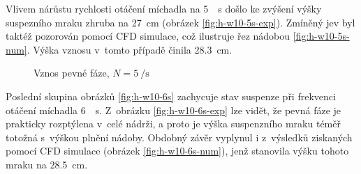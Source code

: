 Vlivem nárůstu rychlosti otáčení míchadla na \SI{5}{\per\second} došlo ke zvýšení výšky suspezního mraku zhruba na \SI{27}{\centi\meter} (obrázek \ref{fig:h-w10-5s-exp}). Zmíněný jev byl taktéž pozorován pomocí CFD simulace, což ilustruje řez nádobou \ref{fig:h-w10-5s-num}. Výška vznosu v~tomto případě činila \SI{28.3}{\centi\meter}. 
\newpage

\begin{figure}[t!]
 \centering
  \qquad 
  \caption{Vznos pevné fáze, $N=\SI{5}{\per\second}$}
  \label{fig:h-w10-5s}
\end{figure}
Poslední skupina obrázků \ref{fig:h-w10-6s} zachycuje stav suspenze při frekvenci otáčení míchadla \SI{6}{\per\second}. Z~obrázku \ref{fig:h-w10-6s-exp} lze vidět, že pevná fáze je prakticky rozptýlena v~celé nádrži, a proto je výška suspenzního mraku téměř totožná s~výškou plnění nádoby. Obdobný závěr vyplynul i z~výsledků ziskaných pomocí CFD simulace (obrázek \ref{fig:h-w10-6s-num}), jenž stanovila výšku tohoto mraku na \SI{28.5}{\centi\meter}.

